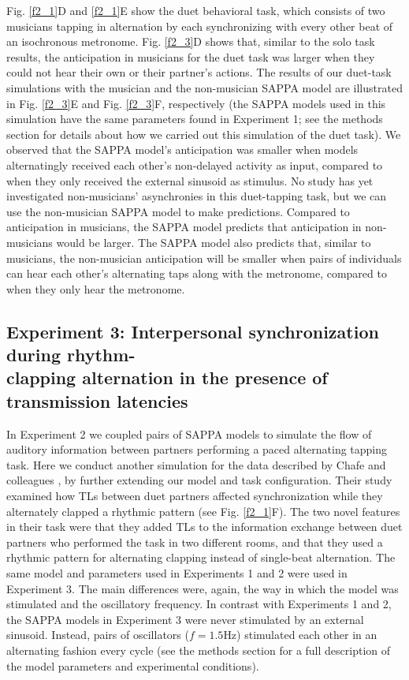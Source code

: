 \documentclass{report}
\begin{document}
Fig.{} \ref{f2_1}D and \ref{f2_1}E show the duet behavioral task, which consists of two musicians tapping in alternation by each synchronizing with every other beat of an isochronous metronome. Fig.{} \ref{f2_3}D shows that, similar to the solo task results, the anticipation in musicians for the duet task was larger when they could not hear their own or their partner's actions. The results of our duet-task simulations with the musician and the non-musician SAPPA model are illustrated in Fig.{} \ref{f2_3}E and Fig.{} \ref{f2_3}F, respectively (the SAPPA models used in this simulation have the same parameters found in Experiment 1; see the methods section for details about how we carried out this simulation of the duet task). We observed that the SAPPA model's anticipation was smaller when models alternatingly received each other's non-delayed activity as input, compared to when they only received the external sinusoid as stimulus. No study has yet investigated non-musicians' asynchronies in this duet-tapping task, but we can use the non-musician SAPPA model to make predictions. Compared to anticipation in musicians, the SAPPA model predicts that anticipation in non-musicians would be larger. The SAPPA model also predicts that, similar to musicians, the non-musician anticipation will be smaller when pairs of individuals can hear each other's alternating taps along with the metronome, compared to when they only hear the metronome.

\subsection{Experiment 3: Interpersonal synchronization during rhythm-\\ clapping alternation in the presence of transmission latencies}

In Experiment 2 we coupled pairs of SAPPA models to simulate the flow of auditory information between partners performing a paced alternating tapping task. Here we conduct another simulation for the data described by Chafe and colleagues \cite{chafe2010effect}, by further extending our model and task configuration. Their study examined how TLs between duet partners affected synchronization while they alternately clapped a rhythmic pattern (see Fig.{} \ref{f2_1}F). The two novel features in their task were that they added TLs to the information exchange between duet partners who performed the task in two different rooms, and that they used a rhythmic pattern for alternating clapping instead of single-beat alternation. The same model and parameters used in Experiments 1 and 2 were used in Experiment 3. The main differences were, again, the way in which the model was stimulated and the oscillatory frequency. In contrast with Experiments 1 and 2, the SAPPA models in Experiment 3 were never stimulated by an external sinusoid. Instead, pairs of oscillators ($f = 1.5$Hz) stimulated each other in an alternating fashion every cycle (see the methods section for a full description of the model parameters and experimental conditions).
\end{document}

